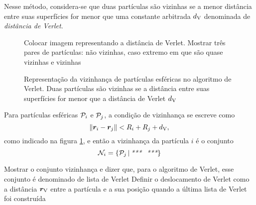 Nesse método, considera-se que duas partículas são vizinhas se a menor distância entre suas superfícies for menor que uma constante arbitrada \(d_{\text{V}}\) denominada de \textit{distância de Verlet}.

\begin{figure}[h]
	\caption{Representação da vizinhança de partículas esféricas no algoritmo de Verlet. Duas partículas são vizinhas se a distância entre suas superfícies for menor que a distância de Verlet \(d_{\text{V}}\)}
	\begin{center}
		\alert{Colocar imagem representando a distância de Verlet. Mostrar três pares de partículas: não vizinhas, caso extremo em que são quase vizinhas e vizinhas}
	\end{center}
	\label{fig:verlet_distance}
\end{figure}

Para partículas esféricas \(\particlei\) e \(\particlej\), a condição de vizinhança se escreve como
\begin{equation*}
	\norm{{\bm{r}}_{i} - {\bm{r}}_{j}} < {R}_{i} + {R}_{j} + d_{\text{V}},
\end{equation*}
como indicado na figura \ref{fig:verlet_distance}, e então a vizinhança da partícula \(i\) é o conjunto
\begin{equation*}
	\neighborhoodi = \set{\particlej \suchThat \alert{}}
\end{equation*}

\alert{Mostrar o conjunto vizinhança e dizer que, para o algoritmo de Verlet, esse conjunto é denominado de lista de Verlet}
\alert{Definir o deslocamento de Verlet como a distância \(\bm{r}_{\text{V}}\) entre a partícula e a sua posição quando a última lista de Verlet foi construída}


